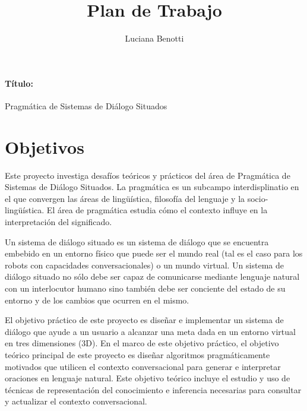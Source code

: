 \documentclass[11pt]{article}
\title{Plan de Trabajo}
\author{Luciana Benotti}
\begin{document}
\maketitle

\paragraph{T\'itulo:} 
Pragm\'atica de Sistemas de Di\'alogo Situados

\section{Objetivos}

Este proyecto investiga desaf\'ios te\'oricos y pr\'acticos del \'area de
Pragm\'atica de Sistemas de Di\'alogo Situados. La pragm\'atica es un subcampo
interdisplinatio en el que convergen las \'areas de ling\"u\'istica, filosof\'ia
del lenguaje y la socio-ling\"u\'istica. El \'area de pragm\'atica
estudia c\'omo el contexto influye en la interpretaci\'on del significado.

Un sistema de di\'alogo situado es un sistema de di\'alogo que se encuentra
embebido en un entorno f\'isico que puede ser el mundo real (tal es el caso
para los robots con capacidades conversacionales) o un mundo virtual. Un
sistema de di\'alogo situado no s\'olo debe ser capaz de comunicarse mediante
lenguaje natural con un interlocutor humano sino tambi\'en debe ser conciente
del estado de su entorno y de los cambios que ocurren en el mismo. 

El objetivo pr\'actico de este proyecto es dise\~nar e implementar un
sistema de di\'alogo que ayude a un usuario a alcanzar una meta dada en un
entorno virtual en tres dimensiones (3D). En el marco de este objetivo
pr\'actico, el objetivo te\'orico principal de este proyecto es
dise\~nar algoritmos pragm\'aticamente motivados que utilicen el contexto
conversacional para generar e interpretar oraciones en lenguaje natural. Este
objetivo te\'orico incluye el estudio y uso de t\'ecnicas de representaci\'on
del conocimiento e inferencia necesarias para consultar y actualizar el
contexto conversacional. 
\end{document}
